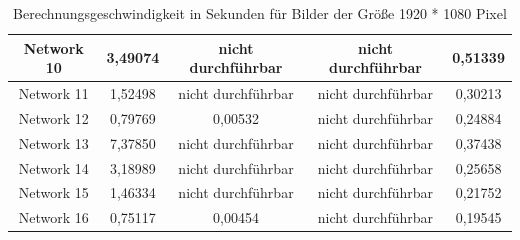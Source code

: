 \begin{table}[H]
\begin{tabular}{ |c|c|c|c|c| }
        Network 10 & 3,49074                                & \textcolor{danger}{nicht durchführbar} & \textcolor{danger}{nicht durchführbar} & 0,51339                                \\ \hline
        Network 11 & 1,52498                                & \textcolor{danger}{nicht durchführbar} & \textcolor{danger}{nicht durchführbar} & 0,30213                                \\ \hline
        Network 12 & 0,79769                                & 0,00532                                & \textcolor{danger}{nicht durchführbar} & 0,24884                                \\ \hline
        Network 13 & 7,37850                                & \textcolor{danger}{nicht durchführbar} & \textcolor{danger}{nicht durchführbar} & 0,37438                                \\ \hline
        Network 14 & 3,18989                                & \textcolor{danger}{nicht durchführbar} & \textcolor{danger}{nicht durchführbar} & 0,25658                                \\ \hline
        Network 15 & 1,46334                                & \textcolor{danger}{nicht durchführbar} & \textcolor{danger}{nicht durchführbar} & 0,21752                                \\ \hline
        Network 16 & 0,75117                                & 0,00454                                & \textcolor{danger}{nicht durchführbar} & 0,19545                                \\ \hline
    \end{tabular}
    \caption{Berechnungsgeschwindigkeit in Sekunden für Bilder der Größe 1920 * 1080 Pixel}
    \label{tab:1920x1080}
\end{table}

